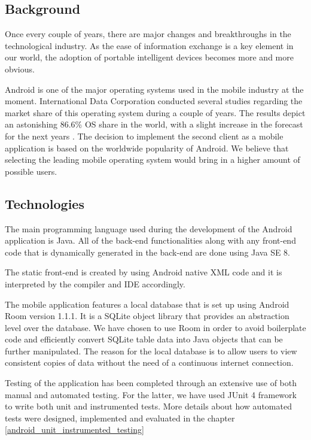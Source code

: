 \subsection{Background}

Once every couple of years, there are major changes and breakthroughs in the technological industry. As the ease of information exchange is a key element in our world, the adoption of portable intelligent devices becomes more and more obvious.

Android is one of the major operating systems used in the mobile industry at the moment. International Data Corporation conducted several studies regarding the market share of this operating system during a couple of years. The results depict an astonishing 86.6\% OS share in the world, with a slight increase in the forecast for the next years \cite{android-market-share}. The decision to implement the second client as a mobile application is based on the worldwide popularity of Android. We believe that selecting the leading mobile operating system would bring in a higher amount of possible users.

\subsection{Technologies}
\label{android_technologies}

The main programming language used during the development of the Android application is Java. All of the back-end functionalities along with any front-end code that is dynamically generated in the back-end are done using Java SE 8.

The static front-end is created by using Android native XML code and it is interpreted by the compiler and IDE accordingly.

The mobile application features a local database that is set up using Android Room version 1.1.1. It is a SQLite object library that provides an abstraction level over the database. We have chosen to use Room in order to avoid boilerplate code and efficiently convert SQLite table data into Java objects that can be further manipulated. The reason for the local database is to allow users to view consistent copies of data without the need of a continuous internet connection.

Testing of the application has been completed through an extensive use of both manual and automated testing. For the latter, we have used JUnit 4 framework to write both unit and instrumented tests. More details about how automated tests were designed, implemented and evaluated in the chapter \ref{android_unit_instrumented_testing}

